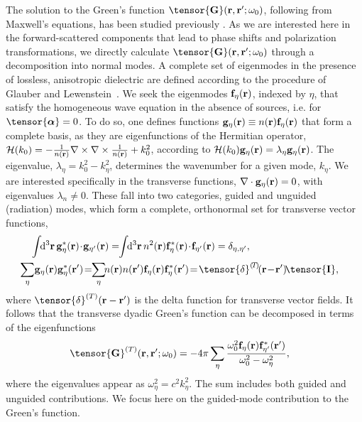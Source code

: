 \documentclass[aps,pra,twocolumn]{revtex4-1} %
\newcommand{\fidx}{\eta}
\newcommand{\unittens}{\tensor{\mathbf{I}}}
\newcommand{\eigenf}{\mbf{f}_\fidx}
\newcommand{\eigenfp}{\mbf{f}_{\fidx'}}
\newcommand{\eigeng}{\mbf{g}_\fidx}
\newcommand{\eigengp}{\mbf{g}_{\fidx'}}
\begin{document}
The solution to the Green's function $\tensor{\mathbf{G}}(\br ,\br' ; \omega_0)$, following from Maxwell's equations,  
has been studied previously \cite{sakoda_optical_1996,sondergaard_general_2001,wubs_multiple-scattering_2004}.  As we are interested here in the forward-scattered components that lead to phase shifts and polarization transformations, we directly calculate $\tensor{\mathbf{G}}(\br ,\br' ; \omega_0)$ through a decomposition into normal modes.  A complete set of eigenmodes in the presence of lossless, anisotropic dielectric are defined according to the procedure of Glauber and Lewenstein~\cite{glauber_quantum_1991}.  We seek the eigenmodes $\eigenf(\mathbf{r})$, indexed by $\fidx$, that satisfy the homogeneous wave equation in the absence of sources, i.e.  for $\tensor{\boldsymbol{\alpha}} = 0$.  To do so, one defines functions $\eigeng(\mbf{r}) \equiv n(\br) \eigenf(\mbf{r})$ that form a complete basis, as they are eigenfunctions of the Hermitian operator, $\mathcal{H}(k_0) = -\frac{1}{n(\mathbf{r})} \nabla\times\nabla\times \frac{1}{n(\mathbf{r})} + k_0^2$, according to $\mathcal{H}(k_0)  \eigeng(\mbf{r}) = \lambda_\fidx \eigeng(\mbf{r})$. The eigenvalue, $\lambda_\fidx= k_0^2-k_\fidx^2$, determines the wavenumber for a given mode, $k_\fidx$.  We are interested specifically in the transverse functions, $\nabla \cdot \eigeng(\br) = 0$, with eigenvalues $\lambda_n \neq 0$.  These fall into two categories, guided and unguided (radiation) modes, which form a complete, orthonormal set for transverse vector functions,
	\begin{align}
	&\int\!\! \mathrm{d}^3\br \, \eigeng^*(\mbf{r}) \!\cdot\! \eigengp(\mbf{r})  =\!\! \int\!\! \mathrm{d}^3\br \, n^2(\br) \eigenf^* (\br)\!\cdot\!  \eigenfp(\br) =\delta_{\fidx, \fidx'},\label{Eq::Orthogonality}\\
	&\!\!\!\!\!\!\!\sum_\fidx \!\eigeng(\br) \eigeng^*(\br') \!=\!\! \sum_\fidx\!\! n(\br)n(\br') \eigenf(\br) \eigenf^*(\br') \!=\!\tensor{\delta}^{(\!T\!)}\!(\br\!-\!\br') \! \unittens, \label{Eq::Completeness}
	\end{align}
where $\tensor{\delta}^{(T)}(\br-\br')$ is the delta function for transverse vector fields.  It follows that the transverse dyadic Green's function can be decomposed in terms of the eigenfunctions~\cite{sakoda_optical_1996, sondergaard_general_2001}
	\begin{align}
		\tensor{\mathbf{G}}^{(T)}(\br,\br'; \omega_0) &= -4\pi \sum_{\fidx} \frac{  \omega_0^2 \eigenf (\br) 
\eigenfp^* (\br')}{\omega_0^2-\omega_\fidx^2},
	\end{align}
where the eigenvalues appear as $\omega_\fidx^2 = c^2 k_\fidx^2$.  The sum includes both guided and unguided contributions. We focus here on the guided-mode contribution to the Green's function. 
\end{document}
